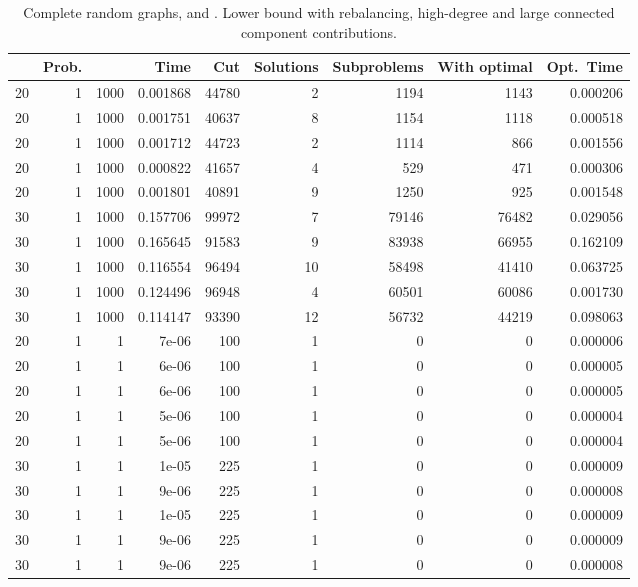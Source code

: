 \documentclass[a4paper,11pt]{article}
\begin{document}
\begin{table}
\begin{center}
\begin{tabular}{|rrr|r|r|rrr|r|}
\hline
 & Prob. &  & Time & Cut & Solutions & Subproblems & With
optimal & Opt.\ Time \\
\hline
20 & 1 & 1000 & 0.001868 & 44780 & 2 & 1194 & 1143 & 0.000206 \\
20 & 1 & 1000 & 0.001751 & 40637 & 8 & 1154 & 1118 & 0.000518 \\
20 & 1 & 1000 & 0.001712 & 44723 & 2 & 1114 & 866 & 0.001556 \\
20 & 1 & 1000 & 0.000822 & 41657 & 4 & 529 & 471 & 0.000306 \\
20 & 1 & 1000 & 0.001801 & 40891 & 9 & 1250 & 925 & 0.001548 \\
30 & 1 & 1000 & 0.157706 & 99972 & 7 & 79146 & 76482 & 0.029056 \\
30 & 1 & 1000 & 0.165645 & 91583 & 9 & 83938 & 66955 & 0.162109 \\
30 & 1 & 1000 & 0.116554 & 96494 & 10 & 58498 & 41410 & 0.063725 \\
30 & 1 & 1000 & 0.124496 & 96948 & 4 & 60501 & 60086 & 0.001730 \\
30 & 1 & 1000 & 0.114147 & 93390 & 12 & 56732 & 44219 & 0.098063 \\
\hline
20 & 1 & 1 & 7e-06 & 100 & 1 & 0 & 0 & 0.000006 \\
20 & 1 & 1 & 6e-06 & 100 & 1 & 0 & 0 & 0.000005 \\
20 & 1 & 1 & 6e-06 & 100 & 1 & 0 & 0 & 0.000005 \\
20 & 1 & 1 & 5e-06 & 100 & 1 & 0 & 0 & 0.000004 \\
20 & 1 & 1 & 5e-06 & 100 & 1 & 0 & 0 & 0.000004 \\
30 & 1 & 1 & 1e-05 & 225 & 1 & 0 & 0 & 0.000009 \\
30 & 1 & 1 & 9e-06 & 225 & 1 & 0 & 0 & 0.000008 \\
30 & 1 & 1 & 1e-05 & 225 & 1 & 0 & 0 & 0.000009 \\
30 & 1 & 1 & 9e-06 & 225 & 1 & 0 & 0 & 0.000009 \\
30 & 1 & 1 & 9e-06 & 225 & 1 & 0 & 0 & 0.000008 \\
\hline
\end{tabular}
\end{center}
\caption{Complete random graphs,  and . Lower
  bound with rebalancing, high-degree and large connected component
  contributions.}
\label{tab:complete-all}
\end{table}
\end{document}
